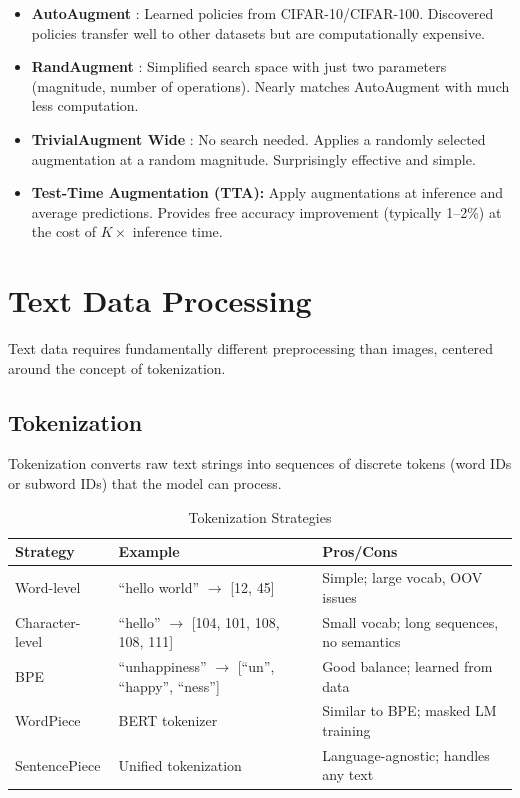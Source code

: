 \begin{itemize}
    \item \textbf{AutoAugment} \cite{cubuk2019autoaugment}: Learned policies from CIFAR-10/CIFAR-100. Discovered policies transfer well to other datasets but are computationally expensive.
    \item \textbf{RandAugment} \cite{cubuk2020randaugment}: Simplified search space with just two parameters (magnitude, number of operations). Nearly matches AutoAugment with much less computation.
    \item \textbf{TrivialAugment Wide} \cite{muller2023torchvision}: No search needed. Applies a randomly selected augmentation at a random magnitude. Surprisingly effective and simple.
    \item \textbf{Test-Time Augmentation (TTA):} Apply augmentations at inference and average predictions. Provides free accuracy improvement (typically 1--2\%) at the cost of $K\times$ inference time.
\end{itemize}

\section{Text Data Processing}

Text data requires fundamentally different preprocessing than images, centered around the concept of tokenization.

\subsection{Tokenization}

Tokenization converts raw text strings into sequences of discrete tokens (word IDs or subword IDs) that the model can process.

\begin{table}[ht]
    \centering
    \caption{Tokenization Strategies}
    \begin{tabular}{L{3cm} L{4cm} L{4cm}}
        \toprule
        \textbf{Strategy} & \textbf{Example} & \textbf{Pros/Cons} \\
        \midrule
        Word-level & ``hello world'' $\to$ [12, 45] & Simple; large vocab, OOV issues \\
        Character-level & ``hello'' $\to$ [104, 101, 108, 108, 111] & Small vocab; long sequences, no semantics \\
        BPE & ``unhappiness'' $\to$ [``un'', ``happy'', ``ness''] & Good balance; learned from data \\
        WordPiece & BERT tokenizer & Similar to BPE; masked LM training \\
        SentencePiece & Unified tokenization & Language-agnostic; handles any text \\
        \bottomrule
    \end{tabular}
\end{table}

